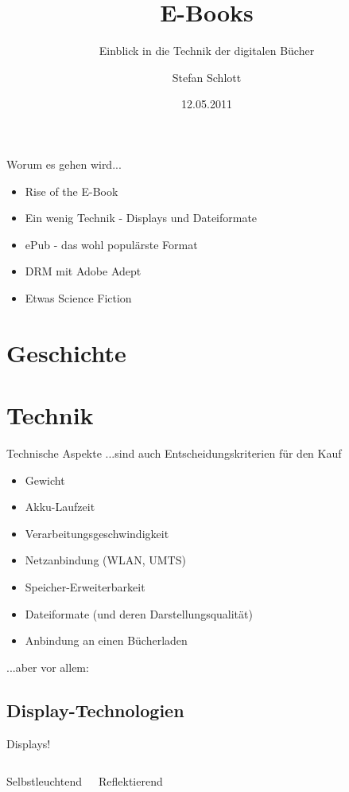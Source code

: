 \documentclass[hyperref={pdfpagelabels=false}]{beamer}
\title{E-Books}
\subtitle{Einblick in die Technik der digitalen Bücher}
\author{%
		Stefan Schlott%
}
\institute{%
	Web: \url{http://stefan.ploing.de/} \\
	Twitter: \href{https://twitter.com/\_skyr}{@\_skyr}
}
\date{12.05.2011}
\begin{document}
\begin{frame}[plain]
\titlepage
\end{frame}


\begin{frame}{Worum es gehen wird...}
	\begin{itemize}
		\item Rise of the E-Book
		\item Ein wenig Technik - Displays und Dateiformate
		\item ePub - das wohl populärste Format
		\item DRM mit Adobe Adept
		\item Etwas Science Fiction
	\end{itemize}
\end{frame}


\section{Geschichte}




\section{Technik}

\begin{frame}{Technische Aspekte}
	...sind auch Entscheidungskriterien für den Kauf
	\begin{itemize}
		\item Gewicht
		\item Akku-Laufzeit
		\item Verarbeitungsgeschwindigkeit
		\item Netzanbindung (WLAN, UMTS)
		\item Speicher-Erweiterbarkeit
		\item Dateiformate (und deren Darstellungsqualität)
		\item Anbindung an einen Bücherladen
	\end{itemize}
	...aber vor allem:
\end{frame}

\subsection{Display-Technologien}

\begin{frame}{Displays!}
	\begin{columns}
			Selbstleuchtend
			\smallskip

			Reflektierend
			\smallskip

	\end{columns}
\end{frame}
\end{document}
